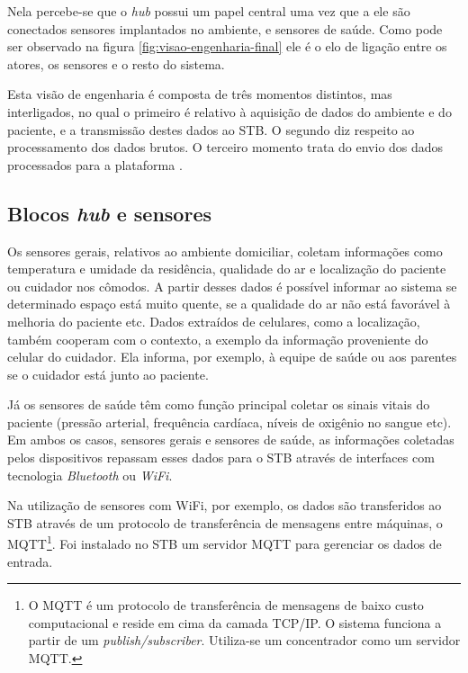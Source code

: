 Nela percebe-se que o \textit{hub} possui um papel central uma vez que a ele
são conectados sensores implantados no ambiente, e sensores de saúde. Como pode
ser observado na figura \ref{fig:visao-engenharia-final} ele é o elo de ligação
entre os atores, os sensores e o resto do sistema.

Esta visão de engenharia é composta de três momentos distintos, mas interligados, no qual
o primeiro é relativo à aquisição de dados do ambiente e do paciente, e a
transmissão destes dados ao STB. O segundo diz respeito ao processamento dos
dados brutos. O terceiro momento trata do envio dos dados processados para a plataforma
\nextsaude[].


\subsection{Blocos \textit{hub} e sensores}

Os sensores gerais, relativos ao ambiente domiciliar, coletam informações como
temperatura e umidade da residência, qualidade do ar e localização do paciente
ou cuidador nos cômodos. A partir desses dados é possível informar ao sistema
se determinado espaço está muito quente, se a qualidade do ar não está
favorável à melhoria do paciente etc. Dados extraídos de celulares, como a
localização, também cooperam com o contexto, a exemplo da informação
proveniente do celular do cuidador. Ela informa, por exemplo, à equipe de saúde
ou aos parentes se o cuidador está junto ao paciente.

Já os sensores de saúde têm como função principal coletar os sinais vitais do
paciente (pressão arterial, frequência cardíaca, níveis de oxigênio no sangue
etc). Em ambos os casos, sensores gerais e sensores de saúde, as informações
coletadas pelos dispositivos repassam  esses dados para o STB através de
interfaces com tecnologia  \textit{Bluetooth} ou \textit{WiFi}.

Na utilização de sensores com WiFi, por exemplo, os dados são transferidos ao
STB através de um protocolo de transferência de mensagens entre máquinas, o
MQTT\footnote{O MQTT é um protocolo de transferência de mensagens de baixo
custo computacional e reside em cima da camada TCP/IP. O sistema funciona a
partir de um \textit{publish/subscriber}. Utiliza-se um concentrador como um
servidor MQTT.}.  Foi instalado no STB um servidor MQTT para gerenciar os dados
de entrada.

